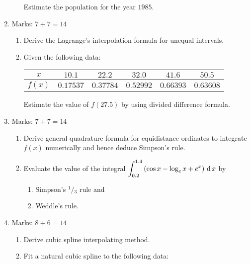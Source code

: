 \documentclass[12pt,class=book,crop=false]{standalone}
\begin{document}
\begin{enumerate}
\begin{enumerate}
\begin{table}[H]
        \end{table}
        Estimate the population for the year $ 1985 $.
    \end{enumerate}
    \item Marks: $ 7+7=14 $
    \begin{enumerate}
        \item Derive the Lagrange's interpolation formula for unequal intervals.
        \item Given the following data:
        \begin{table}[H]
            \centering
            \begin{tabular}{|c|c|c|c|c|c|}
                \hline
                $ x $& $ 10.1 $& $ 22.2 $&$  32.0 $&$  41.6 $&$  50.5 $\\\hline               
                $ f(x) $ & $ 0.17537 $& $ 0.37784 $& $ 0.52992 $&$ 0.66393 $& $ 0.63608 $\\\hline
            \end{tabular}
        \end{table}        
        Estimate the value of $ f(27.5) $ by using divided difference formula.
    \end{enumerate}
    \item Marks: $ 7+7=14 $
    \begin{enumerate}
        \item Derive general quadrature formula for equidistance ordinates to integrate $ f(x) $ numerically and hence deduce Simpson's rule.
        \item Evaluate the value of the integral $\displaystyle \int_{0.2}^{1.4} \left( \cos x- \log_e x+ e^x \right) \,\mathrm{d}\, x $ by 
        \begin{enumerate}[noitemsep]
            \item Simpson's $ {}^{1}/{}_3 $ rule and
            \item Weddle's rule.
        \end{enumerate}
    \end{enumerate}
    \item Marks: $ 8+6=14 $
    \begin{enumerate}
        \item Derive cubic spline interpolating method.
        \item Fit a natural cubic spline to the following data:
        \begin{table}[H]
            \centering
            \begin{tabular}{|c|c|c|c|}
                \hline

\end{tabular}
\end{table}
\end{enumerate}
\end{enumerate}
\end{document}
